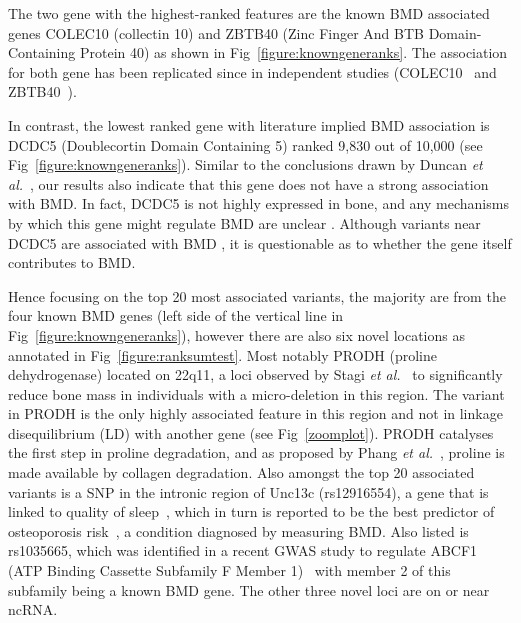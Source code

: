 \documentclass[10pt,letterpaper]{article}
\begin{document}
The two gene with the highest-ranked features are the known BMD associated genes COLEC10 (collectin 10) and ZBTB40 (Zinc
Finger And BTB Domain-Containing Protein 40) as shown in Fig~\ref{figure:knowngeneranks}.  The association for both gene
has been replicated since in independent studies (COLEC10~\cite{Kemp2014} and ZBTB40~\cite{Nielson2016}).

In contrast, the lowest ranked gene with literature implied BMD association is DCDC5 (Doublecortin Domain Containing 5) ranked 9,830
out of 10,000 (see Fig~\ref{figure:knowngeneranks}).  Similar to the conclusions drawn by Duncan {\it et
  al.}~\cite{Duncan.2011}, our results also indicate that this gene does not have a strong association with BMD.  In
fact, DCDC5 is not highly expressed in bone, and any mechanisms by which this gene might regulate BMD are unclear
\cite{Thakker2012}.  Although variants near DCDC5 are associated with BMD \cite{Rivadeneira2009}, it is questionable as
to whether the gene itself contributes to BMD.

Hence focusing on the top 20 most associated variants, the majority are from the four known BMD genes (left side of the
vertical line in Fig~\ref{figure:knowngeneranks}), however there are also six novel locations as annotated in
Fig~\ref{figure:ranksumtest}. Most notably PRODH (proline dehydrogenase) located on 22q11, a loci observed by Stagi {\it
  et al.}~\cite{Stagi.2010} to significantly reduce bone mass in individuals with a micro-deletion in this region. The
variant in PRODH is the only highly associated feature in this region and not in linkage disequilibrium (LD) with
another gene (see Fig~\ref{zoomplot}). PRODH catalyses the first step in proline degradation, and as proposed by Phang
{\it et al.}~\cite{Phang.2008}, proline is made available by collagen degradation. Also amongst the top 20 associated
variants is a SNP in the intronic region of Unc13c (rs12916554), a gene that is linked to quality of
sleep~\cite{Nicod2016}, which in turn is reported to be the best predictor of osteoporosis risk~\cite{Magali2016}, a
condition diagnosed by measuring BMD.  Also listed is rs1035665, which was identified in a recent GWAS study to regulate
ABCF1 (ATP Binding Cassette Subfamily F Member 1)~\cite{Dixon2007} with member 2 of this subfamily being a known BMD
gene. The other three novel loci are on or near ncRNA.
\end{document}
